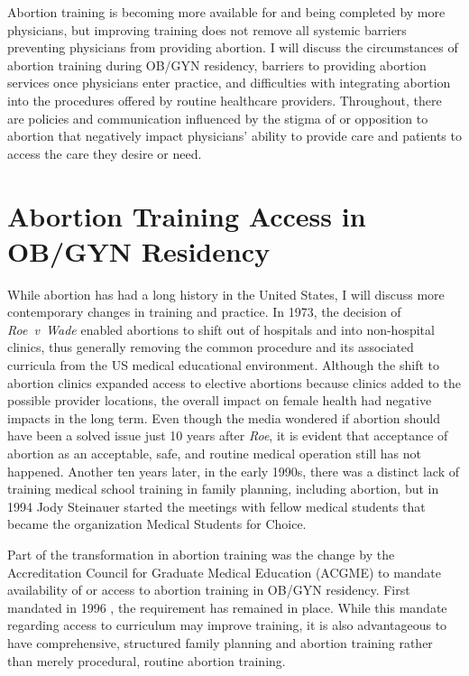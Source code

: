 \documentclass[letterpaper, 12pt]{article}
\begin{document}
Abortion training is becoming more available for and being completed by more physicians, but improving training does not remove all systemic barriers preventing physicians from providing abortion. I will discuss the circumstances of abortion training during OB/GYN residency, barriers to providing abortion services once physicians enter practice, and difficulties with integrating abortion into the procedures offered by routine healthcare providers. Throughout, there are policies and communication influenced by the stigma of or opposition to abortion that negatively impact physicians' ability to provide care and patients to access the care they desire or need.

\section*{Abortion Training Access in OB/GYN Residency}

While abortion has had a long history \autocite[For a thesis about training for both procedural and elective abortions in the United States from 1920 to 2007, see:][]{ayres_providing_2009} in the United States, I will discuss more contemporary changes in training and practice.
In 1973, the decision of \textit{Roe~v~Wade} enabled abortions to shift out of hospitals and into non-hospital clinics, thus generally removing the common procedure and its associated curricula from the US medical educational environment. \autocite[pg. 404]{aksel_unintended_2013}
Although the shift to abortion clinics expanded access to elective abortions because clinics added to the possible provider locations, the overall impact on female health had negative impacts in the long term.
Even though the media wondered if abortion should have been a solved issue just 10 years after \textit{Roe}\autocite{mark_obenhaus_abortion_1983}, it is evident that acceptance of abortion as an acceptable, safe, and routine medical operation still has not happened.
Another ten years later, in the early 1990s, there was a distinct lack of training medical school training in family planning, including abortion, but in 1994 Jody Steinauer started the meetings with fellow medical students that became the organization Medical Students for Choice. \autocite[pg. 404--5]{aksel_unintended_2013}

Part of the transformation in abortion training was the change by the Accreditation Council for Graduate Medical Education (ACGME) to mandate availability of or access to abortion training in OB/GYN residency. \autocite[IV.A.6.d, pg. 17]{accreditation_council_for_graduate_medical_education_acgme_2014}
First mandated in 1996 \autocite[pg. 146]{freedman_obstacles_2010}, the requirement has remained in place.
While this mandate regarding access to curriculum may improve training, it is also advantageous to have comprehensive, structured family planning and abortion training rather than merely procedural, routine abortion training. \autocite[pg. 297]{macisaac_routine_2012}
\end{document}
